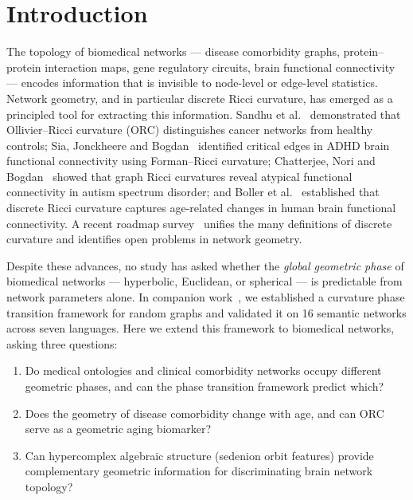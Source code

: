 \documentclass[11pt,a4paper]{article}
\begin{document}
\section{Introduction}
\label{sec:intro}

The topology of biomedical networks --- disease comorbidity graphs, protein--protein interaction maps, gene regulatory circuits, brain functional connectivity --- encodes information that is invisible to node-level or edge-level statistics. Network geometry, and in particular discrete Ricci curvature, has emerged as a principled tool for extracting this information. Sandhu et al.~\cite{sandhu2015graph} demonstrated that Ollivier--Ricci curvature (ORC) distinguishes cancer networks from healthy controls; Sia, Jonckheere and Bogdan~\cite{sia2021forman} identified critical edges in ADHD brain functional connectivity using Forman--Ricci curvature; Chatterjee, Nori and Bogdan~\cite{asd2022ricci} showed that graph Ricci curvatures reveal atypical functional connectivity in autism spectrum disorder; and Boller et al.~\cite{frontiers2023ricci} established that discrete Ricci curvature captures age-related changes in human brain functional connectivity. A recent roadmap survey~\cite{samal2025roadmap} unifies the many definitions of discrete curvature and identifies open problems in network geometry.

Despite these advances, no study has asked whether the \emph{global geometric phase} of biomedical networks --- hyperbolic, Euclidean, or spherical --- is predictable from network parameters alone. In companion work~\cite{agourakis2026theory,agourakis2026semantic}, we established a curvature phase transition framework for random graphs and validated it on 16 semantic networks across seven languages. Here we extend this framework to biomedical networks, asking three questions:

\begin{enumerate}
    \item Do medical ontologies and clinical comorbidity networks occupy different geometric phases, and can the phase transition framework predict which?
    \item Does the geometry of disease comorbidity change with age, and can ORC serve as a geometric aging biomarker?
    \item Can hypercomplex algebraic structure (sedenion orbit features) provide complementary geometric information for discriminating brain network topology?
\end{enumerate}
\end{document}
